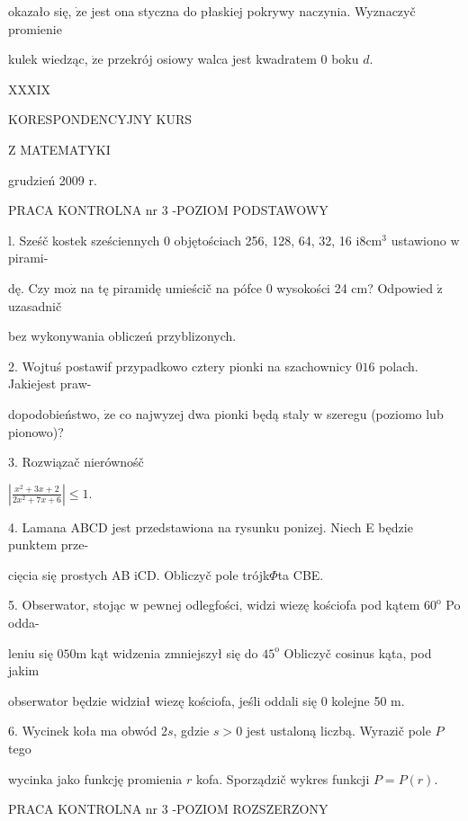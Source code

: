\documentclass[a4paper,12pt]{article}
\begin{document}
okazało się, $\dot{\mathrm{z}}\mathrm{e}$ jest ona styczna do płaskiej pokrywy naczynia. Wyznaczyč promienie

kulek wiedząc, $\dot{\mathrm{z}}\mathrm{e}$ przekrój osiowy walca jest kwadratem $0$ boku $d.$





XXXIX

KORESPONDENCYJNY KURS

Z MATEMATYKI

grudzień 2009 r.

PRACA KONTROLNA nr 3 -POZIOM PODSTAWOWY

l. Sześč kostek sześciennych $0$ objętościach 256, 128, 64, 32, 16 $\mathrm{i}8\mathrm{c}\mathrm{m}^{3}$ ustawiono $\mathrm{w}$ pirami-

dę. Czy $\mathrm{m}\mathrm{o}\dot{\mathrm{z}}$ na tę piramidę umieścič na pófce $0$ wysokości 24 cm? Odpowied $\acute{\mathrm{z}}$ uzasadnič

bez wykonywania obliczeń przyblizonych.

2. Wojtuś postawif przypadkowo cztery pionki na szachownicy $016$ polach. Jakiejest praw-

dopodobieństwo, $\dot{\mathrm{z}}\mathrm{e}$ co najwyzej dwa pionki będą staly $\mathrm{w}$ szeregu (poziomo lub pionowo)?

3. Rozwiązač nierównośč

$|\displaystyle \frac{x^{2}+3x+2}{2x^{2}+7x+6}|\leq 1.$

4. Lamana ABCD jest przedstawiona na rysunku ponizej. Niech E będzie punktem prze-

cięcia się prostych AB iCD. Obliczyč pole trójk$\Phi$ta CBE.

5. Obserwator, stojąc $\mathrm{w}$ pewnej odlegfości, widzi wiezę kościofa pod kątem $60^{\mathrm{o}}$ Po odda-

leniu się $050\mathrm{m}$ kąt widzenia zmniejszył się do $45^{\mathrm{o}}$ Obliczyč cosinus kąta, pod jakim

obserwator będzie widział wiezę kościofa, jeśli oddali się $0$ kolejne 50 $\mathrm{m}.$

6. Wycinek koła ma obwód $2s$, gdzie $s > 0$ jest ustaloną liczbą. Wyrazič pole $P$ tego

wycinka jako funkcję promienia $r$ kofa. Sporządzič wykres funkcji $P=P(r).$





PRACA KONTROLNA nr 3 -POZIOM ROZSZERZONY
\end{document}
